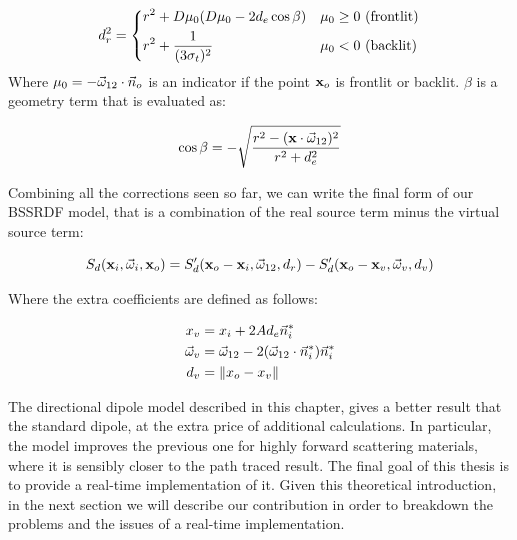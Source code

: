 $$
d_r^2 = \begin{dcases}
r^2 + D \mu_0 (D \mu_0 - 2 d_e \cos \beta) & \mu_0 \geq 0 \  \text{(frontlit)}\\
r^2 + \frac{1}{(3 \sigma_t)^2} & \mu_0 < 0 \ \text{(backlit)}
\end{dcases}
$$
Where $\mu_0 = - \vec{\omega}_{12} \cdot \vec{n}_o$ is an indicator if the point $\mathbf{x}_o$ is frontlit or backlit. $\beta$ is a geometry term that is evaluated as:

$$
\cos \beta = - \sqrt{\frac{r^2 - (\mathbf{x} \cdot \vec{\omega}_{12})^2}{r^2 + d_e^2}}
$$

Combining all the corrections seen so far, we can write the final form of our BSSRDF model, that is a combination of the real source term minus the virtual source term:

$$
S_d(\mathbf{x}_i, \vec{\omega}_i, \mathbf{x}_o) = S'_d(\mathbf{x}_o - \mathbf{x}_i, \vec{\omega}_{12}, d_r) - S'_d(\mathbf{x}_o - \mathbf{x}_v, \vec{\omega}_{v}, d_v)
$$

Where the extra coefficients are defined as follows:

\begin{equation*}
\begin{split}
x_v &= x_i + 2 A d_e \vec{n}_i^* \\
\vec{\omega}_v &= \vec{\omega}_{12} - 2 (\vec{\omega}_{12} \cdot \vec{n}_i^*) \vec{n}_i^* \\
d_v &= \|x_o - x_v\|
\end{split}
\end{equation*}

The directional dipole model described in this chapter, gives a better result that the standard dipole, at the extra price of additional calculations. In particular, the model improves the previous one for highly forward scattering materials, where it is sensibly closer to the path traced result. The final goal of this thesis is to provide a real-time implementation of it. Given this theoretical introduction, in the next section we will describe our contribution in order to breakdown the problems and the issues of a real-time implementation.

